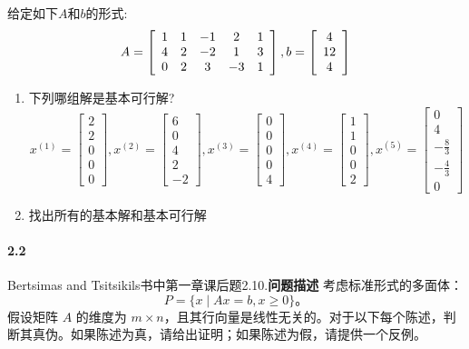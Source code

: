\documentclass[12pt,a4paper]{article}
\begin{document}
给定如下$A$和$b$的形式:
\[ A= \left[\begin{array}{c c c c c}
1 & 1& -1 & 2 & 1 \\4 & 2 & -2 &1 & 3 \\ 0 & 2 & 3 &-3 &1
\end{array}\right], b= \left[\begin{array}{c }
4  \\12 \\ 4
\end{array}\right] \]
\begin{enumerate}
    \item 下列哪组解是基本可行解? 
\[ x^{(1)}= \left[\begin{array}{c } 2  \\2 \\ 0 \\0 \\0 \end{array}\right],
x^{(2)}=\left[\begin{array}{c } 6  \\0 \\ 4 \\2 \\-2 \end{array}\right] ,
x^{(3)}=\left[\begin{array}{c } 0  \\0 \\ 0 \\0 \\4 \end{array}\right] ,
x^{(4)}=   \left[\begin{array}{c } 1  \\1 \\ 0 \\0 \\2 \end{array}\right],
x^{(5)}=   \left[\begin{array}{c } 0  \\4 \\ -\frac{8}{3} \\-\frac{4}{3} \\0 \end{array}\right]  \]
\item 找出所有的基本解和基本可行解
\end{enumerate}

\paragraph{2.2}
Bertsimas and Tsitsikils书中第一章课后题2.10.\textbf{问题描述} 考虑标准形式的多面体：
\[
P = \{ x \mid Ax = b, x \geq 0 \}。
\]
假设矩阵 \( A \) 的维度为 \( m \times n \)，且其行向量是线性无关的。对于以下每个陈述，判断其真伪。如果陈述为真，请给出证明；如果陈述为假，请提供一个反例。
\end{document}
